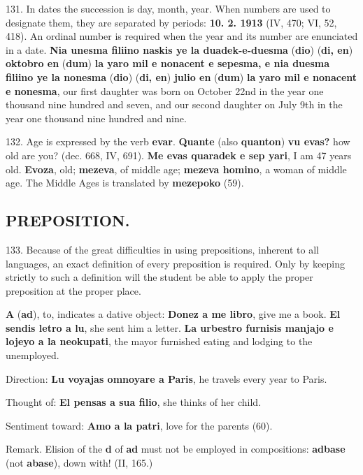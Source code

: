 131. In dates the succession is day, month, year. When numbers are used to designate them, they are separated by periods: \textbf{10. 2. 1913} (IV, 470; VI, 52, 418). An ordinal number is required when the year and its number are enunciated in a date. \textbf{Nia unesma filiino naskis ye la duadek-e-duesma }(\textbf{dio}) (\textbf{di, en})\textbf{ oktobro en }(\textbf{dum})\textbf{ la yaro mil e nonacent e sepesma, e nia duesma filiino ye la nonesma }(\textbf{dio}) (\textbf{di, en})\textbf{ julio en }(\textbf{dum})\textbf{ la yaro mil e nonacent e nonesma}, our first daughter was born on October 22nd in the year one thousand nine hundred and seven, and our second daughter on July 9th in the year one thousand nine hundred and nine.

132. Age is expressed by the verb \textbf{evar}. \textbf{Quante }(also \textbf{quanton})\textbf{ vu evas?} how old are you? (dec. 668, IV, 691). \textbf{Me evas quaradek e sep yari}, I am 47 years old. \textbf{Evoza}, old; \textbf{mezeva}, of middle age; \textbf{mezeva homino}, a woman of middle age. The Middle Ages is translated by \textbf{mezepoko} (59).

\subsection*{PREPOSITION.}
133. Because of the great difficulties in using prepositions, inherent to all languages, an exact definition of every preposition is required. Only by keeping strictly to such a definition will the student be able to apply the proper preposition at the proper place.

\textbf{A} (\textbf{ad}), to, indicates a dative object: \textbf{Donez a me libro}, give me a book. \textbf{El sendis letro a lu}, she sent him a letter. \textbf{La urbestro furnisis manjajo e lojeyo a la neokupati}, the mayor furnished eating and lodging to the unemployed.

Direction: \textbf{Lu voyajas omnoyare a Paris}, he travels every year to Paris.

Thought of: \textbf{El pensas a sua filio}, she thinks of her child.

Sentiment toward: \textbf{Amo a la patri}, love for the parents (60).

\small Remark. Elision of the \textbf{d} of \textbf{ad} must not be employed in compositions: \textbf{adbase} (not \textbf{abase}), down with! (II, 165.) \normalsize

